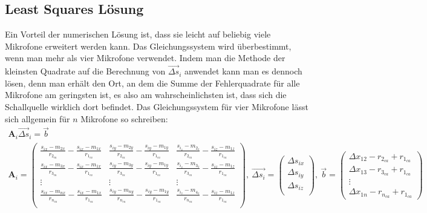 \subsection{Least Squares Lösung}
Ein Vorteil der numerischen Lösung ist, dass sie leicht auf beliebig viele Mikrofone erweitert werden kann. Das Gleichungssystem wird überbestimmt, wenn man mehr als vier Mikrofone verwendet. Indem man die Methode der kleinsten Quadrate auf die Berechnung von $\vec{\Delta{s}}_i$ anwendet kann man es dennoch lösen, denn man erhält den Ort, an dem die Summe der Fehlerquadrate für alle Mikrofone am geringsten ist, es also am wahrscheinlichsten ist, dass sich die Schallquelle wirklich dort befindet.
Das Gleichungssystem für vier Mikrofone lässt sich allgemein für $n$ Mikrofone so schreiben:
\begin{gather*}
    \mathbf{A}_i\vec{\Delta{s}}_i = \vec{b}\\
    \mathbf{A}_i =
    {\begin{pmatrix}
          \frac{s_{ix} - m_{2x}}{r_{2_{ca}}} - \frac{s_{ix} - m_{1x}}{r_{1_{ca}}} & \frac{s_{iy} - m_{2y}}{r_{2_{ca}}} - \frac{s_{iy} - m_{1y}}{r_{1_{ca}}} & \frac{s_{i_z} - m_{2_z}}{r_{2_{ca}}} - \frac{s_{iz} - m_{1z}}{r_{1_{ca}}} \\
          \frac{s_{ix} - m_{3x}}{r_{3_{ca}}} - \frac{s_{ix} - m_{1x}}{r_{1_{ca}}} & \frac{s_{iy} - m_{3y}}{r_{3_{ca}}} - \frac{s_{iy} - m_{1y}}{r_{1_{ca}}} & \frac{s_{i_z} - m_{3_z}}{r_{3_{ca}}} - \frac{s_{iz} - m_{1z}}{r_{1_{ca}}} \\
          \vdots & \vdots & \vdots \\
          \frac{s_{ix} - m_{nx}}{r_{n_{ca}}} - \frac{s_{ix} - m_{1x}}{r_{1_{ca}}} & \frac{s_{iy} - m_{ny}}{r_{n_{ca}}} - \frac{s_{iy} - m_{1y}}{r_{1_{ca}}} & \frac{s_{i_z} - m_{4_z}}{r_{n_{ca}}} - \frac{s_{iz} - m_{1z}}{r_{1_{ca}}} \\
      \end{pmatrix}},
    ~
    \vec{\Delta{s}_i} =
    \begin{pmatrix}
        {\Delta{s}}_{ix} \\
        {\Delta{s}}_{iy} \\
        {\Delta{s}}_{iz} \\
    \end{pmatrix},
    ~
    \vec{b} =
    \begin{pmatrix}
        \Delta{x_{12}} - r_{2_{ca}} + r_{1_{ca}}\\
        \Delta{x_{13}} - r_{3_{ca}} + r_{1_{ca}}\\
        \vdots \\
        \Delta{x_{1n}} - r_{n_{ca}} + r_{1_{ca}}
    \end{pmatrix}
\end{gather*}
